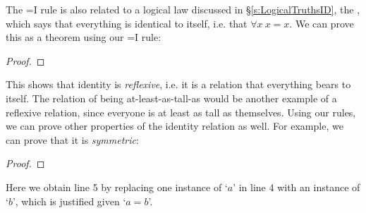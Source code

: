 The =I rule is also related to a logical law discussed in \S\ref{s:LogicalTruthsID}, the , which says that everything is identical to itself, i.e. that $\forall x \ x = x$.  We can prove this as a theorem using our =I rule:

\begin{proof}
\open
	 \fl{}
	 
\close
{} 
\end{proof}

This shows that identity is \emph{reflexive}, i.e. it is a relation that everything bears to itself.  The relation of being at-least-as-tall-as would be another example of a reflexive relation, since everyone is at least as tall as themselves.  Using our rules, we can prove other properties of the identity relation as well.  For example, we can prove that it is \emph{symmetric}:

\begin{proof}
\open
	 \fl{}
	\open
		 \fl{}
		\open
			  
			 
			 
		\close
		 
	\close
	 
\close
{} 


\end{proof}



\noindent Here we obtain line 5 by replacing one instance of `$a$' in line 4 with an instance of `$b$', which is justified given `$a= b$'.


